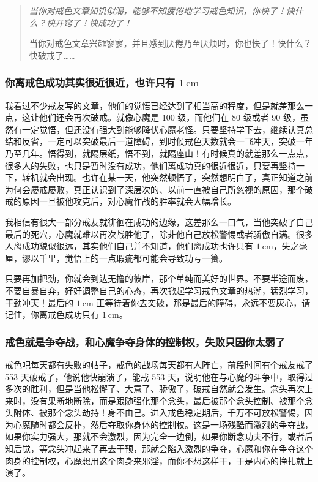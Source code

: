 \begin{quotation}\it
    当你对戒色文章如饥似渴，能够不知疲倦地学习戒色知识，你快了！快什么？快开窍了！快成功了！

    当你对戒色文章兴趣寥寥，并且感到厌倦乃至厌烦时，你也快了！快什么？快破戒了……
\end{quotation}

\subsubsection{你离戒色成功其实很近很近，也许只有 $1\ \unit{\cm}$}

我看过不少戒友写的文章，他们的觉悟已经达到了相当高的程度，但是就差那么一点，这让他们还会再次破戒。就像心魔是 100 级，而他们在 80 级或者 90 级，虽然有一定觉悟，但还没有强大到能够降伏心魔老怪。只要坚持学下去，继续认真总结和反省，一定可以突破最后一道障碍，到时候戒色天数就会一飞冲天，突破一年乃至几年。悟得到，就隔层纸，悟不到，就隔座山！有时候真的就差那么一点点，很多人的失败，也只是暂时没有成功，他们离成功真的很近很近，只要再坚持一下，转机就会出现。也许在某一天，他突然顿悟了，突然想明白了，真正知道之前为何会屡戒屡败，真正认识到了深层次的、以前一直被自己所忽视的原因，那个破戒的原因一旦被他攻克后，对心魔作战的胜率就会大幅增长。

我相信有很大一部分戒友就徘徊在成功的边缘，这差那么一口气，当他突破了自己最后的死穴，心魔就难以再次战胜他了，除非他自己放松警惕或者骄傲自满。很多人离成功貌似很远，其实他们自己并不知道，他们离成功也许只有 $1\ \unit{\cm}$，失之毫厘，谬以千里，觉悟上的一点瑕疵都可能会导致功亏一篑。

只要再加把劲，你就会到达无撸的彼岸，那个单纯而美好的世界。不要半途而废，不要自暴自弃，好好调整自己的心态，再次掀起学习戒色文章的热潮，猛烈学习，干劲冲天！最后的 $1\ \unit{\cm}$ 正等待着你去突破，那是最后的障碍，永远不要灰心，请记住，你离戒色成功只有 $1\ \unit{\cm}$。

\subsubsection{戒色就是争夺战，和心魔争夺身体的控制权，失败只因你太弱了}

戒色吧每天都有失败的帖子，戒色的战场每天都有人阵亡，前段时间有个戒友戒了 553 天破戒了，他说他快崩溃了，能戒 553 天，说明他在与心魔的斗争中，取得过多次的胜利，但是当他松懈了、大意了、骄傲了，破戒自然就会发生。念头再次上来时，没有果断地断除，而是跟随强化那个念头，最后被那个念头控制、被那个念头附体、被那个念头劫持！身不由己。进入戒色稳定期后，千万不可放松警惕，因为心魔随时都会反扑，然后夺取你身体的控制权。这是一场残酷而激烈的争夺战，如果你实力强大，那就不会激烈，因为完全一边倒，如果你断念功夫不行，或者后知后觉，等念头冲起来了再去干预，那就会陷入激烈的争夺，心魔和你在争夺这个肉身的控制权，心魔想用这个肉身来邪淫，而你不想这样干，于是内心的挣扎就上演了。

